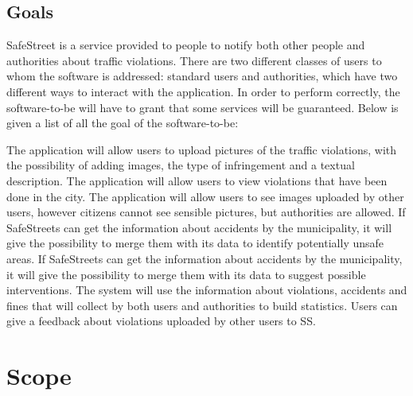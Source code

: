 \documentclass[../RASD.tex]{subfiles}
\begin{document}
    \subsection{Goals}\label{subsec:goals}
    SafeStreet is a service provided to people to notify both other people and authorities about traffic violations. There are two different classes of users to whom the software is addressed: standard users and authorities, which have two different ways to interact with the application.
    In order to perform correctly, the software-to-be will have to grant that some services will be guaranteed. Below is given a list of all the goal of the software-to-be:
    \begin{enumerate}
         The application will allow users to upload pictures of the traffic violations, with the possibility of adding images, the type of infringement and a textual description.
         The application will allow users to view violations that have been done in the city.
         The application will allow users to see images uploaded by other users, however citizens cannot see sensible pictures, but authorities are allowed.
         If SafeStreets can get the information about accidents by the municipality, it will give the possibility to merge them with its data to identify potentially unsafe areas.
         If SafeStreets can get the information about accidents by the municipality, it will give the possibility to merge them with its data to suggest possible interventions.
         The system will use the information about violations, accidents and fines that will collect by both users and authorities to build statistics.
         Users can give a feedback about violations uploaded by other users to SS.
    \end{enumerate}
    \section{Scope}\label{sec:scope}
\end{document}
